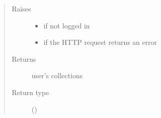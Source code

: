 \documentclass[letterpaper,10pt,english]{sphinxmanual}
\begin{document}
\begin{fulllineitems}
\begin{fulllineitems}
\begin{quote}
\begin{description}
\item[{Raises}] \leavevmode\begin{itemize}
\item {} 
{\hyperref[\detokenize{autoapi/pine/client/exceptions/index:pine.client.exceptions.PineClientAuthException}]{}} \textendash{} if not logged in

\item {} 
{\hyperref[\detokenize{autoapi/pine/client/exceptions/index:pine.client.exceptions.PineClientHttpException}]{}} \textendash{} if the HTTP request returns an error

\end{itemize}

\item[{Returns}] \leavevmode
user’s collections

\item[{Return type}] \leavevmode
{}()

\end{description}\end{quote}

\end{fulllineitems}



\end{fulllineitems}
\end{document}
